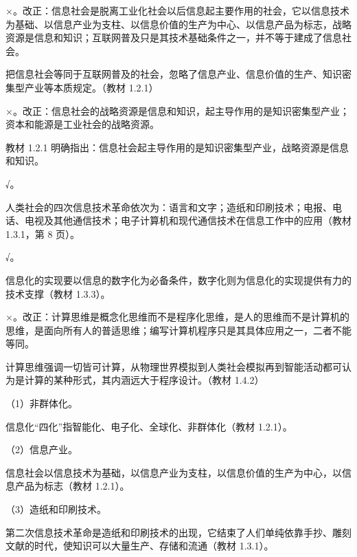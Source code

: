 \documentclass[a4paper,11pt]{article}
\begin{document}
\q ×。改正：信息社会是脱离工业化社会以后信息起主要作用的社会，它以信息技术为基础、以信息产业为支柱、以信息价值的生产为中心、以信息产品为标志，战略资源是信息和知识；互联网普及只是其技术基础条件之一，并不等于建成了信息社会。\begin{analysis}把信息社会等同于互联网普及的社会，忽略了信息产业、信息价值的生产、知识密集型产业等本质规定。（教材 1.2.1）\end{analysis}

\q ×。改正：信息社会的战略资源是信息和知识，起主导作用的是知识密集型产业；资本和能源是工业社会的战略资源。\begin{analysis}教材 1.2.1 明确指出：信息社会起主导作用的是知识密集型产业，战略资源是信息和知识。\end{analysis}

\q √。\begin{analysis}人类社会的四次信息技术革命依次为：语言和文字；造纸和印刷技术；电报、电话、电视及其他通信技术；电子计算机和现代通信技术在信息工作中的应用（教材 1.3.1，第 8 页）。\end{analysis}

\q √。\begin{analysis}信息化的实现要以信息的数字化为必备条件，数字化则为信息化的实现提供有力的技术支撑（教材 1.3.3）。\end{analysis}

\q ×。改正：计算思维是概念化思维而不是程序化思维，是人的思维而不是计算机的思维，是面向所有人的普适思维；编写计算机程序只是其具体应用之一，二者不能等同。\begin{analysis}计算思维强调一切皆可计算，从物理世界模拟到人类社会模拟再到智能活动都可认为是计算的某种形式，其内涵远大于程序设计。（教材 1.4.2）\end{analysis}


\q （1）非群体化。\begin{analysis}信息化“四化”指智能化、电子化、全球化、非群体化（教材 1.2.1）。\end{analysis}

\q （2）信息产业。\begin{analysis}信息社会以信息技术为基础，以信息产业为支柱，以信息价值的生产为中心，以信息产品为标志（教材 1.2.1）。\end{analysis}

\q （3）造纸和印刷技术。\begin{analysis}第二次信息技术革命是造纸和印刷技术的出现，它结束了人们单纯依靠手抄、雕刻文献的时代，使知识可以大量生产、存储和流通（教材 1.3.1）。\end{analysis}
\end{document}
